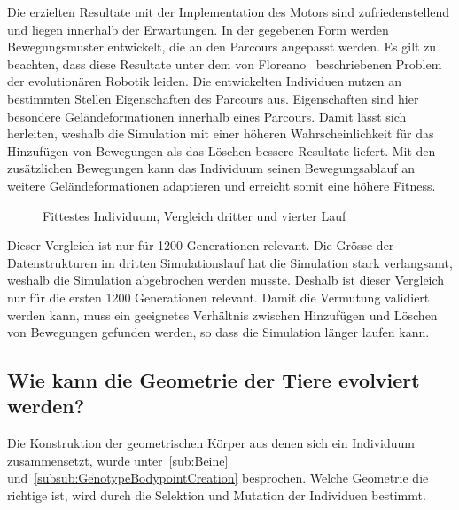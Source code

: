       \smallskip

      Die erzielten Resultate mit der Implementation des Motors sind zufriedenstellend und
      liegen innerhalb der Erwartungen.
      In der gegebenen Form werden Bewegungsmuster entwickelt, die an den Parcours angepasst werden.
      Es gilt zu beachten, dass diese Resultate unter dem von Floreano~\cite{Floreano2010} beschriebenen Problem
      der evolutionären Robotik leiden.
      Die entwickelten Individuen nutzen an bestimmten Stellen Eigenschaften des Parcours aus.
      Eigenschaften sind hier besondere Geländeformationen innerhalb eines Parcours.
      Damit lässt sich herleiten, weshalb die Simulation mit einer höheren Wahrscheinlichkeit
      für das Hinzufügen von Bewegungen als das Löschen bessere Resultate liefert.
      Mit den zusätzlichen Bewegungen kann das Individuum seinen Bewegungsablauf
      an weitere Geländeformationen adaptieren und erreicht somit eine höhere Fitness.

      \begin{figure}[H]
        \centering
        
        \caption{Fittestes Individuum, Vergleich dritter und vierter Lauf}
      \end{figure}

      Dieser Vergleich ist nur für 1200 Generationen relevant.
      Die Grösse der Datenstrukturen im dritten Simulationslauf hat die Simulation stark verlangsamt,
      weshalb die Simulation abgebrochen werden musste.
      Deshalb ist dieser Vergleich nur für die ersten 1200 Generationen relevant.
      Damit die Vermutung validiert werden kann,
      muss ein geeignetes Verhältnis zwischen Hinzufügen und Löschen von Bewegungen gefunden werden,
      so dass die Simulation länger laufen kann.

    \subsection{Wie kann die Geometrie der Tiere evolviert werden?}

      Die Konstruktion der geometrischen Körper aus denen sich ein Individuum zusammensetzt,
      wurde unter~\vref{sub:Beine} und~\vref{subsub:GenotypeBodypointCreation} besprochen.
      Welche Geometrie die richtige ist, wird durch die Selektion und Mutation der Individuen bestimmt.


